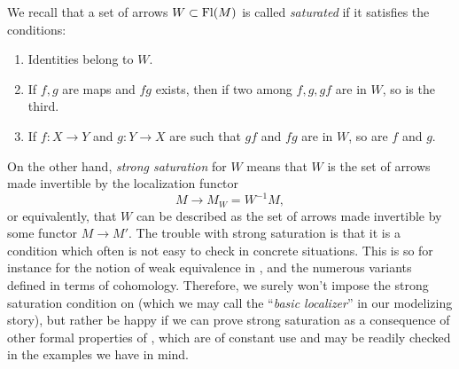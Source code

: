 \label{sec:64}%
We recall that a set of arrows $W\subset\operatorname{Fl}(M)$ is called
\emph{saturated} if it satisfies the conditions:
\begin{enumerate}[label=\alph*)]
\item\label{it:64.a}
  Identities belong to $W$.
\item\label{it:64.b}
  If $f,g$ are maps and $fg$ exists, then if two among $f,g,gf$ are in
  $W$, so is the third.
\item\label{it:64.c}
  If $f:X\to Y$ and $g:Y\to X$ are such that $gf$ and $fg$ are in $W$,
  so are $f$ and $g$.
\end{enumerate}

On the other hand, \emph{strong saturation} for $W$ means that $W$ is
the set of arrows made invertible by the localization functor
\[M\to M_W=W^{-1}M,\]
or equivalently, that $W$ can be described as the set of arrows made
invertible by some functor $M\to M'$. The trouble with strong
saturation is that it is a condition which often is not easy to check
in concrete situations. This is so for instance for the notion of weak
equivalence in \Cat, and the numerous variants defined in terms of
cohomology. Therefore, we surely won't impose the strong saturation
condition on \scrW{} (which we may call the ``\emph{basic
  localizer}'' in our modelizing story), but rather be happy if we can
prove strong saturation as a consequence of other formal properties of
\scrW, which are of constant use and may be readily checked in the
examples we have in mind.

